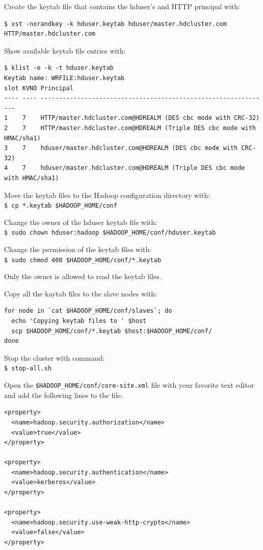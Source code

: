 Create the keytab file that contains the hduser's and HTTP principal with: 
\lstset{style=bashstyle}
\begin{lstlisting}
$ xst -norandkey -k hduser.keytab hduser/master.hdcluster.com HTTP/master.hdcluster.com
\end{lstlisting}

Show available keytab file entries with:
\lstset{style=bashstyle}
\begin{lstlisting}
$ klist -e -k -t hduser.keytab
Keytab name: WRFILE:hduser.keytab
slot KVNO Principal
---- ---- ---------------------------------------------------------------
1    7    HTTP/master.hdcluster.com@HDREALM (DES cbc mode with CRC-32)
2    7    HTTP/master.hdcluster.com@HDREALM (Triple DES cbc mode with HMAC/sha1)
3    7    hduser/master.hdcluster.com@HDREALM (DES cbc mode with CRC-32)
4    7    hduser/master.hdcluster.com@HDREALM (Triple DES cbc mode with HMAC/sha1)
\end{lstlisting}

Move the keytab files to the Hadoop configuration directory with: \\
\verb|$ cp *.keytab $HADOOP_HOME/conf|

Change the owner of the hduser keytab file with:\\
\verb|$ sudo chown hduser:hadoop $HADOOP_HOME/conf/hduser.keytab|

Change the permission of the keytab files with: \\
\verb|$ sudo chmod 400 $HADOOP_HOME/conf/*.keytab|

Only the owner is allowed to read the keytab files.

Copy all the kaytab files to the slave nodes with:
\begin{verbatim}
for node in `cat $HADOOP_HOME/conf/slaves`; do
  echo 'Copying keytab files to ' $host
  scp $HADOOP_HOME/conf/*.keytab $host:$HADOOP_HOME/conf/
done
\end{verbatim}

Stop the cluster with command: \\
\verb|$ stop-all.sh|

Open the \verb|$HADOOP_HOME/conf/core-site.xml| file with your favorite text editor and add the following lines to the file:
\lstset{style=bashstyle}
\begin{lstlisting}
<property>
  <name>hadoop.security.authorization</name>
  <value>true</value>
</property>

<property>
  <name>hadoop.security.authentication</name>
  <value>kerberos</value>
</property>

<property>
  <name>hadoop.security.use-weak-http-crypto</name>
  <value>false</value>
</property>
\end{lstlisting}

